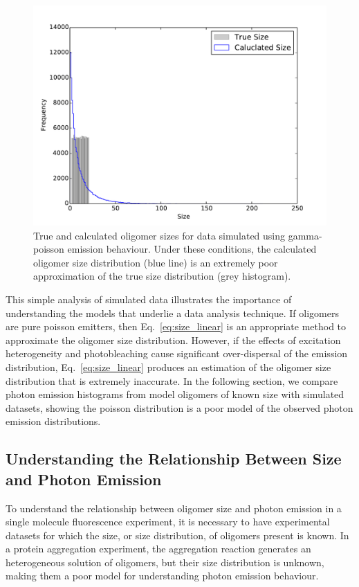 \begin{figure}
   \begin{center}
      \includegraphics*[clip=true, width=6in]{sizing/True_vs_Measured_oligomer_events_uniform_100000_hist.pdf}
      \caption{True and calculated oligomer sizes for data simulated using gamma-poisson emission behaviour. Under these conditions, the calculated oligomer size distribution (blue line) is an extremely poor approximation of the true size distribution (grey histogram).}
      \label{fig:gamma_poisson_size_photons_uniform}
   \end{center}
\end{figure}

This simple analysis of simulated data illustrates the importance of understanding the models that underlie a data analysis technique. If oligomers are pure poisson emitters, then Eq.~\ref{eq:size_linear} is an appropriate method to approximate the oligomer size distribution. However, if the effects of excitation heterogeneity and photobleaching cause significant over-dispersal of the emission distribution, Eq.~\ref{eq:size_linear} produces an estimation of the oligomer size distribution that is extremely inaccurate. In the following section, we compare photon emission histograms from model oligomers of known size with simulated datasets, showing the poisson distribution is a poor model of the observed photon emission distributions.   

\subsection{Understanding the Relationship Between Size and Photon Emission}
To understand the relationship between oligomer size and photon emission in a single molecule fluorescence experiment, it is necessary to have experimental datasets for which the size, or size distribution, of oligomers present is known. In a protein aggregation experiment, the aggregation reaction generates an heterogeneous solution of oligomers, but their size distribution is unknown, making them a poor model for understanding photon emission behaviour. 


